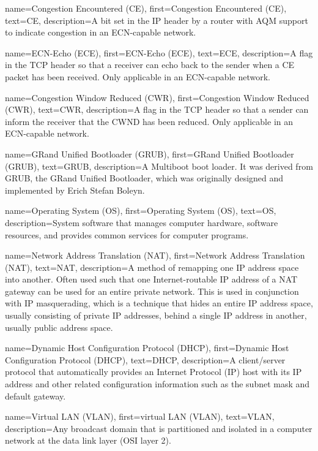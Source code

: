 {
    name={Congestion Encountered (CE)},
    first={Congestion Encountered (CE)},
    text={CE},
    description={A bit set in the IP header by a router with AQM support to indicate congestion in an ECN-capable network.}
}

{
    name={ECN-Echo (ECE)},
    first={ECN-Echo (ECE)},
    text={ECE},
    description={A flag in the TCP header so that a receiver can echo back to the sender when a CE packet has been received. Only applicable in an ECN-capable network.}
}

{
    name={Congestion Window Reduced (CWR)},
    first={Congestion Window Reduced (CWR)},
    text={CWR},
    description={A flag in the TCP header so that a sender can inform the receiver that the CWND has been reduced. Only applicable in an ECN-capable network.}
}

{
    name={GRand Unified Bootloader (GRUB)},
    first={GRand Unified Bootloader (GRUB)},
    text={GRUB},
    description={A Multiboot boot loader. It was derived from GRUB, the GRand Unified Bootloader, which was originally designed and implemented by Erich Stefan Boleyn.}
}

{
    name={Operating System (OS)},
    first={Operating System (OS)},
    text={OS},
    description={System software that manages computer hardware, software resources, and provides common services for computer programs.}
}

{
    name={Network Address Translation (NAT)},
    first={Network Address Translation (NAT)},
    text={NAT},
    description={A method of remapping one IP address space into another. Often used such that one Internet-routable IP address of a NAT gateway can be used for an entire private network. This is used in conjunction with IP masquerading, which is a technique that hides an entire IP address space, usually consisting of private IP addresses, behind a single IP address in another, usually public address space.}
}

{
    name={Dynamic Host Configuration Protocol (DHCP)},
    first={Dynamic Host Configuration Protocol (DHCP)},
    text={DHCP},
    description={A client/server protocol that automatically provides an Internet Protocol (IP) host with its IP address and other related configuration information such as the subnet mask and default gateway.}
}

{
    name={Virtual LAN (VLAN)},
    first={virtual LAN (VLAN)},
    text={VLAN},
    description={Any broadcast domain that is partitioned and isolated in a computer network at the data link layer (OSI layer 2).}
}

